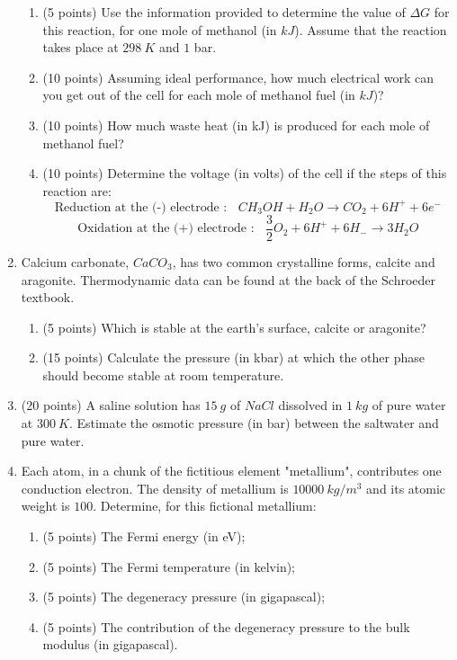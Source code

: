 \documentclass[fleqn]{article}
\begin{document}
\begin{enumerate}
\begin{enumerate}
      \item (5 points) Use the information provided to determine the value of $\Delta G$ for this reaction, for
      one mole of methanol (in $kJ$). Assume that the reaction takes place at $298 ~ K$ and $1$ bar.


      \item (10 points) Assuming ideal performance, how much electrical work can you get out of the
      cell for each mole of methanol fuel (in $kJ$)?


      \item (10 points) How much waste heat (in kJ) is produced for each mole of methanol fuel?


      \item (10 points) Determine the voltage (in volts) of the cell if the steps of this reaction are:
      $$
        \text{Reduction at the (-) electrode :} ~~~~ CH_3 OH+H_2 O \longrightarrow CO_2+6H^++6e^-
      $$
      $$
        \text{Oxidation at the (+) electrode :} ~~~~ \dfrac{3}{2} O_2+6H^+ +6H_- \longrightarrow 3H_2 O 
      $$

    \end{enumerate}

    \item Calcium carbonate, $CaCO_3$, has two common crystalline forms, calcite and aragonite. Thermodynamic 
    data can be found at the back of the Schroeder textbook.
    \begin{enumerate}
      \item (5 points) Which is stable at the earth's surface, calcite or aragonite?

      \item (15 points) Calculate the pressure (in kbar) at which the other phase should become stable
      at room temperature.

    \end{enumerate}

    \item (20 points) A saline solution has $15 ~ g$ of $NaCl$ dissolved in $1 ~ kg$ of pure water at $300 ~ K$. Estimate
    the osmotic pressure (in bar) between the saltwater and pure water.


    \item Each atom, in a chunk of the fictitious element "metallium", contributes one conduction electron. 
    The density of metallium is $10000 ~ kg/m^3$ and its atomic weight is $100$. Determine, for
    this fictional metallium:
    \begin{enumerate}
      \item (5 points) The Fermi energy (in eV);

      \item (5 points) The Fermi temperature (in kelvin);

      \item (5 points) The degeneracy pressure (in gigapascal);

      \item (5 points) The contribution of the degeneracy pressure to the bulk modulus (in gigapascal).

    \end{enumerate}

  \end{enumerate}
\end{document}
